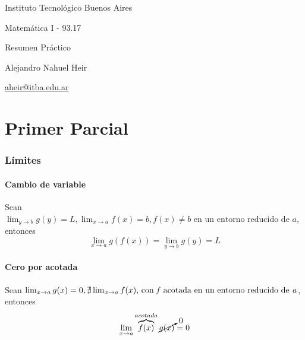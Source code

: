 \documentclass[11pt,titlepage]{article}
\begin{document}
\begin{titlepage}
	\centering
	{\Large Instituto Tecnológico Buenos Aires \par}
	\vspace{2cm}
	{\huge Matemática I - 93.17 \par}
	\vspace{2cm}
	{\Huge Resumen Práctico \par}
	\vspace{2cm}
	{\ttfamily Alejandro Nahuel Heir \par}
	{\ttfamily \href{mailto:aheir@itba.edu.ar}{aheir@itba.edu.ar} \par}
	\vspace{0.5cm}
	{ \par}
\end{titlepage}

\begin{abstract}
	Usar el presente material a modo de refuerzo y/o repaso de los contenidos; no contiene ninguna justificación 
	teórica profunda. Fue realizado principalmente a modo de práctica para con \LaTeX. Cualquier sugerencia, correción
	y/o similar, \href{mailto:aheir@itba.edu.ar}{es bienvenida}.
\end{abstract}

\tableofcontents
\newpage
\listoffigures
\newpage
\listoftables
\newpage

\part{Primer Parcial}
\section{Límites}

\subsection{Cambio de variable}
Sean $\lim_{y \to b} g(y)=L, \lim_{x \to a} f(x)=b, f(x) \neq b \text{ en un entorno reducido de } a$,\\
entonces
\begin{equation}\label{cambiovar}
	\lim_{x \to a} g(f(x)) = \lim_{y \to b} g(y) = L
\end{equation}

\subsection{Cero por acotada}
Sean $\lim_{x \to a} g(x) = 0, \nexists \lim_{x \to a} f(x) \text{, con \textit{f} acotada en un entorno reducido de \textit{a}}$,\\
entonces
\begin{equation}\label{ceroacotada}
		\lim_{x \to a} \overbrace{f(x)}^{acotada} \cancelto{0}{g(x)} = 0
\end{equation}
\end{document}
